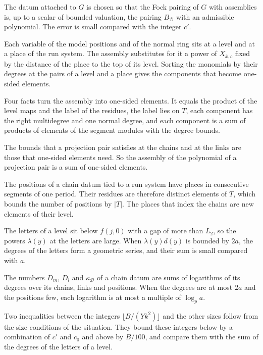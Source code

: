 The datum attached to $G$ is chosen so that the Fock pairing of $G$ with assemblies is, up to a scalar of bounded
valuation, the pairing $B_{\mathcal D}$ with an admissible polynomial. The error is small compared with the integer
$c'$.

Each variable of the model positions and of the normal ring sits at a level and at a place of the run system. The
assembly substitutes for it a power of $X_{\bar x,c}$ fixed by the distance of the place to the top of its level. Sorting
the monomials by their degrees at the pairs of a level and a place gives the components that become one-sided
elements.

Four facts turn the assembly into one-sided elements. It equals the product of the level maps and the label of the
residues, the label lies on $T$, each component has the right multidegree and one normal degree, and each component is
a sum of products of elements of the segment modules with the degree bounds.

The bounds that a projection pair satisfies at the chains and at the links are those that one-sided elements need.
So the assembly of the polynomial of a projection pair is a sum of one-sided elements.

The positions of a chain datum tied to a run system have places in consecutive segments of one period. Their residues
are therefore distinct elements of $T$, which bounds the number of positions by $|T|$. The places that index the chains
are new elements of their level.

The letters of a level sit below $f(j,0)$ with a gap of more than $L_2$, so the powers $\lambda(y)$ at the letters are
large. When $\lambda(y)d(y)$ is bounded by $2a$, the degrees of the letters form a geometric series, and their sum is
small compared with $a$.

The numbers $D_m$, $D_l$ and $\kappa_{\mathcal D}$ of a chain datum are sums of logarithms of its degrees over its
chains, links and positions. When the degrees are at most $2a$ and the positions few, each logarithm is at most a
multiple of $\log_pa$.

Two inequalities between the integers $\lfloor B/(Yk^2)\rfloor$ and the other sizes follow from the size conditions of
the situation. They bound these integers below by a combination of $c'$ and $c_0$ and above by $B/100$, and compare
them with the sum of the degrees of the letters of a level.

